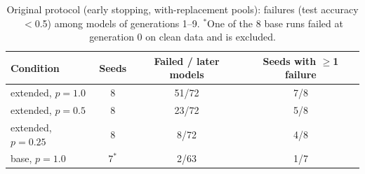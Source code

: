 \documentclass[10pt,letterpaper]{article}
\begin{document}
\begin{table}[h]
\centering\footnotesize
\caption{Original protocol (early stopping, with-replacement pools): failures (test
accuracy $<$0.5) among models of generations 1--9. $^\ast$One of the 8 base runs failed
at generation 0 on clean data and is excluded.}
\label{tab:fail}
\begin{tabular}{@{}lccc@{}}
\toprule
Condition & Seeds & Failed / later models & Seeds with $\geq$1 failure\\
\midrule
extended, $p{=}1.0$   & 8        & 51/72 & 7/8\\
extended, $p{=}0.5$   & 8        & 23/72 & 5/8\\
extended, $p{=}0.25$  & 8        & 8/72  & 4/8\\
base, $p{=}1.0$       & $7^\ast$ & 2/63  & 1/7\\
\bottomrule
\end{tabular}
\end{table}

\begin{table}[h]
\centering\footnotesize
\caption{The 2$\times$2 over the two protocol choices (extended, $p{=}1$): failed
trainings among generations 1--9. ``Seeds 0--2'' compares like with like, the same seeds
and initialisations; ``all seeds'' uses the 8 seeds that exist for each cell
(only 3 for early stopping without duplicates). Intervals are 95\% Wilson intervals and
treat trainings as independent, which within a run they are not.}
\label{tab:fact}
\resizebox{\columnwidth}{!}{}
\end{table}

\begin{table}[h]
\centering\footnotesize
\caption{First failing generation of each failing original run, retrained from its saved
pool without early stopping: test accuracy (epoch at which validation accuracy first
exceeded 0.9). The 300-epoch retraining also stretches the learning-rate schedule, so it
is not an exact continuation.}
\label{tab:retrain}
\resizebox{\columnwidth}{!}{}
\end{table}

\begin{table}[h]
\centering\footnotesize
\caption{First failing generation of each failing corrected-protocol run, retrained from
its saved pool for 450 epochs (3$\times$ the original budget; the schedule is stretched
too). One of 13 reaches 0.9 (base, seed 2, at epoch 151), four improve without reaching
it, eight do not.}
\label{tab:retrain2}
\resizebox{\columnwidth}{!}{}
\end{table}
\end{document}
